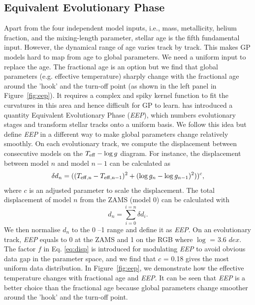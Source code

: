 
\subsection{Equivalent Evolutionary Phase}

Apart from the four independent model inputs, i.e., mass, metallicity, helium fraction, and the mixing-length parameter, stellar age is the fifth fundamental input. However, the dynamical range of age varies track by track. This makes GP models hard to map from age to global parameters. 
%
We need a uniform input to replace the age. The fractional age is an option but we find that global parameters (e.g. effective temperature) sharply change with the fractional age around the 'hook' and the turn-off point (as shown in the left panel in Figure~\ref{fig:eep}). It requires a complex and spiky kernel function to fit the curvatures in this area and hence difficult for GP to learn. \citet{2016ApJS..222....8D} has introduced a quantity Equivalent Evolutionary Phase ({\it EEP}), which numbers evolutionary stages and transform stellar tracks onto a uniform basis. We follow this idea but define {\it EEP} in a different way to make global parameters change relatively smoothly.
%
On each evolutionary track, we compute the displacement between consecutive models on the $T_{\rm eff} - \log g$ diagram. For instance, the displacement between model $n$ and model $n-1$ can be calculated as
\begin{equation}\label{eq:disp}
\delta d_{n} = ((T_{\rm eff, n} - T_{\rm eff, n-1}) ^{2} + (\log g _{n} - \log g_{n-1})^{2}))^{c},
\end{equation}
where $c$ is an adjusted parameter to scale the displacement. 
%
The total displacement of model $n$ from the ZAMS (model 0) can be calculated with
\begin{equation}
d_{n} = \sum_{i = 0}^{i = n} \delta d_{i} .
\end{equation}
We then normalise $d_{n}$ to the 0 --1 range and define it as {\it EEP}. On an evolutionary track, {\it EEP} equals to 0 at the ZAMS and 1 on the RGB where $\log$ = 3.6 $dex$. The factor $f$ in Eq. \ref{eq:disp} is introduced for modulating {\it EEP} to avoid obvious data gap in the parameter space, and we find that $c$ = 0.18 gives the most uniform data distribution.
%
In Figure~\ref{fig:eep}, we demonstrate how the effective temperature changes with fractional age and {\it EEP}. It can be seen that {\it EEP} is a better choice than the fractional age because global parameters change smoother around the 'hook' and the turn-off point.

